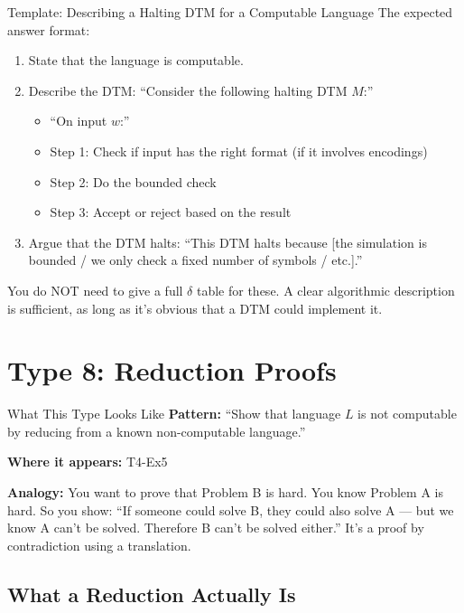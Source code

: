\documentclass[11pt,a4paper]{article}
\begin{document}
\begin{templatebox}{Template: Describing a Halting DTM for a Computable Language}
The expected answer format:

\begin{enumerate}
    \item State that the language is computable.
    \item Describe the DTM: ``Consider the following halting DTM $M$:''
    \begin{itemize}
        \item ``On input $w$:''
        \item Step 1: Check if input has the right format (if it involves encodings)
        \item Step 2: Do the bounded check
        \item Step 3: Accept or reject based on the result
    \end{itemize}
    \item Argue that the DTM halts: ``This DTM halts because [the simulation is bounded / we only check a fixed number of symbols / etc.].''
\end{enumerate}

You do NOT need to give a full $\delta$ table for these. A clear algorithmic description is sufficient, as long as it's obvious that a DTM could implement it.
\end{templatebox}

\newpage
\section{Type 8: Reduction Proofs}

\begin{notebox}{What This Type Looks Like}
\textbf{Pattern:} ``Show that language $L$ is not computable by reducing from a known non-computable language.''

\textbf{Where it appears:} T4-Ex5

\textbf{Analogy:} You want to prove that Problem B is hard. You know Problem A is hard. So you show: ``If someone could solve B, they could also solve A --- but we know A can't be solved. Therefore B can't be solved either.'' It's a proof by contradiction using a translation.
\end{notebox}

\subsection{What a Reduction Actually Is}
\end{document}
